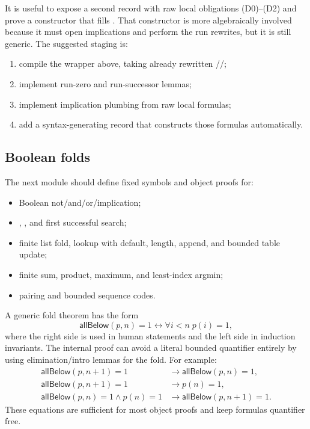It is useful to expose a second record with raw local obligations (D0)--(D2) and prove a constructor that fills .  That constructor is more algebraically involved because it must open implications and perform the run rewrites, but it is still generic.  The suggested staging is:
\begin{enumerate}[label=\arabic*.]
\item compile the wrapper above, taking already rewritten //;
\item implement run-zero and run-successor lemmas;
\item implement implication plumbing from raw local formulas;
\item add a syntax-generating record that constructs those formulas automatically.
\end{enumerate}

\subsection{Boolean folds}

The next module should define fixed symbols and object proofs for:
\begin{itemize}
\item Boolean not/and/or/implication;
\item {}, , and first successful search;
\item finite list fold, lookup with default, length, append, and bounded table update;
\item finite sum, product, maximum, and least-index argmin;
\item pairing and bounded sequence codes.
\end{itemize}

A generic fold theorem has the form
\[
 \mathsf{allBelow}(p,n)=1
 \leftrightarrow \forall i<n\;p(i)=1,
\]
where the right side is used in human statements and the left side in induction invariants.  The internal proof can avoid a literal bounded quantifier entirely by using elimination/intro lemmas for the fold.  For example:
\begin{align*}
 \mathsf{allBelow}(p,n+1)=1&\to\mathsf{allBelow}(p,n)=1,\\
 \mathsf{allBelow}(p,n+1)=1&\to p(n)=1,\\
 \mathsf{allBelow}(p,n)=1\wedge p(n)=1&\to
   \mathsf{allBelow}(p,n+1)=1.
\end{align*}
These equations are sufficient for most object proofs and keep formulas quantifier free.

